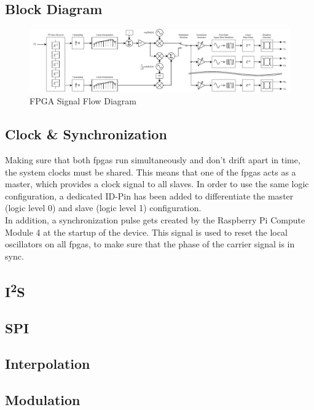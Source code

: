 \newpage
\subsection{Block Diagram}
\begin{figure}[h!]
	\centering
	\includegraphics[width=22.2cm, angle=90]{images/4_Design/FPGA/FPGA Block Diagram.pdf}
	\vspace{-0.2cm}
    \caption{FPGA Signal Flow Diagram}
    \label{fig:fpga-signal-flow}
\end{figure}

\subsection{Clock \& Synchronization}
Making sure that both \acrshort{fpga}s run simultaneously and don't drift apart in time, the system clocks must be shared. This means that one of the \acrshort{fpga}s acts as a master, which provides a clock signal to all slaves. In order to use the same logic configuration, a dedicated ID-Pin has been added to differentiate the master (logic level 0) and slave (logic level 1) configuration.\\
In addition, a synchronization pulse gets created by the Raspberry Pi Compute Module 4 at the startup of the device. This signal is used to reset the local oscillators on all \acrshort{fpga}s, to make sure that the phase of the carrier signal is in sync.



\subsection{I\textsuperscript{2}S} \label{fpga_i2s}
\subsection{SPI} \label{fpga_spi}
\subsection{Interpolation}
\subsection{Modulation}
